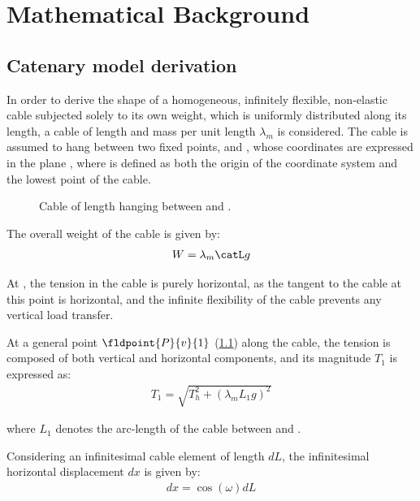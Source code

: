 \chapter{Mathematical Background}
\label{mathematical_background}

\minitoc{}

\section{Catenary model derivation}
\label{mb_catenary_model_derivation}

In order to derive the shape of a homogeneous, infinitely flexible, non-elastic cable subjected
solely to its own weight, which is uniformly distributed along its length, a cable of length
\catL{} and mass per unit length $\lambda_m$ is considered. The cable is assumed to hang between
two fixed points,  and , whose coordinates are expressed in the plane
, where  is defined as both the origin of the coordinate system and
the lowest point of the cable.

\begin{figure}
	\centering
	\caption{
		Cable of length \catL{} hanging between  and .
	}
	\label{mb_cmd_schematic}
\end{figure}

The overall weight  of the cable is given by:
\begin{align}
	W = \lambda_m \catL g
	\label{mb_cmd_weight_equation}
\end{align}

At , the tension in the cable is purely horizontal, as the tangent to the cable at
this point is horizontal, and the infinite flexibility of the cable prevents any vertical load
transfer.

At a general point $\fldpoint{P}{v}{1}$ (\cref{mb_cmd_schematic}) along the cable,
the tension is composed of both vertical and horizontal components, and its magnitude $T_1$ is
expressed as:
\begin{align}
	T_1 = \sqrt{T_h^2 + \left(\lambda_m L_1 g\right)^2}
	\label{mb_cmd_tension_equation}
\end{align}

where $L_1$ denotes the arc-length of the cable between  and .

Considering an infinitesimal cable element of length $dL$, the infinitesimal horizontal
displacement $dx$ is given by:
\begin{align}
	dx = \cos{\left(\omega\right)} dL
\end{align}

